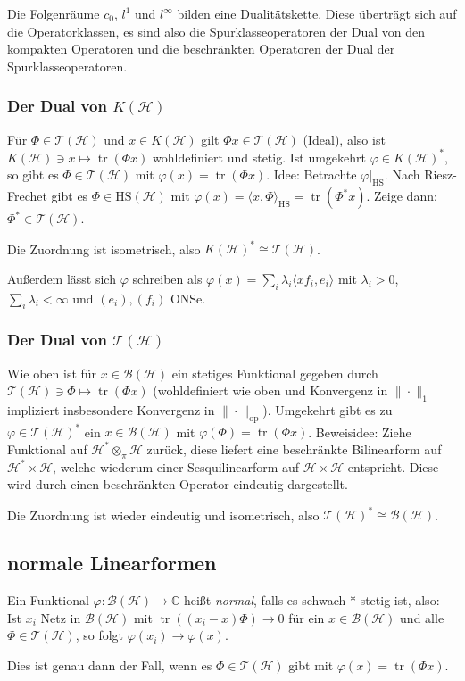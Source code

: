 \documentclass[11pt,a4paper]{scrartcl}
\newcommand{\C}{\mathbb{C}} %
\newcommand{\Hc}{\mathcal{H}}
\newcommand{\B}{\mathcal{B}}
\newcommand{\T}{\mathcal{T}}
\theoremstyle{plain}
\theoremstyle{definition}
\theoremstyle{remark}
\DeclareMathOperator{\tr}{tr}
\begin{document}
Die Folgenräume $c_0$, $l^1$ und $l^\infty$ bilden eine Dualitätskette. Diese überträgt sich auf die Operatorklassen, es sind also die Spurklasseoperatoren der Dual von den kompakten Operatoren und die beschränkten Operatoren der Dual der Spurklasseoperatoren.

\subsubsection{Der Dual von $K(\Hc)$}

Für $\Phi\in \T(\Hc)$ und $x\in K(\Hc)$ gilt $\Phi x\in \T(\Hc)$ (Ideal), also ist $K(\Hc) \ni x\mapsto \tr(\Phi x)$ wohldefiniert und stetig. Ist umgekehrt $\varphi\in K(\Hc)^*$, so gibt es $\Phi\in \T(\Hc)$ mit $\varphi(x)=\tr(\Phi x)$. Idee: Betrachte $\varphi|_\mathrm{HS}$. Nach Riesz-Frechet gibt es $\Phi\in \mathrm{HS}(\Hc)$ mit $\varphi(x)=\langle x, \Phi \rangle_\mathrm{HS} = \tr(\Phi^* x)$. Zeige dann: $\Phi^* \in \T(\Hc)$.

Die Zuordnung ist isometrisch, also $K(\Hc)^*\cong \T(\Hc)$.

Außerdem lässt sich $\varphi$ schreiben als $\varphi(x)=\sum_i \lambda_i \langle x f_i, e_i \rangle$ mit $\lambda_i > 0$, $\sum_i \lambda_i < \infty$ und $(e_i),(f_i)$ ONSe.

\subsubsection{Der Dual von $\T(\Hc)$}

Wie oben ist für $x\in \B(\Hc)$ ein stetiges Funktional gegeben durch $\T(\Hc) \ni \Phi \mapsto \tr(\Phi x)$ (wohldefiniert wie oben und Konvergenz in $\|\cdot\|_1$ impliziert insbesondere Konvergenz in $\|\cdot\|_\mathrm{op}$). Umgekehrt gibt es zu $\varphi\in \T(\Hc)^*$ ein $x\in \B(\Hc)$ mit $\varphi(\Phi)=\tr(\Phi x)$. Beweisidee: Ziehe Funktional auf $\Hc^*\otimes_\pi \Hc$ zurück, diese liefert eine beschränkte Bilinearform auf $\Hc^* \times \Hc$, welche wiederum einer Sesquilinearform auf $\Hc\times \Hc$ entspricht. Diese wird durch einen beschränkten Operator eindeutig dargestellt.

Die Zuordnung ist wieder eindeutig und isometrisch, also $\T(\Hc)^*\cong \B(\Hc)$.

\subsection{normale Linearformen}

Ein Funktional $\varphi: \B(\Hc)\to \C$ heißt \emph{normal}, falls es schwach-*-stetig ist, also: Ist $x_i$ Netz in $\B(\Hc)$ mit $\tr((x_i-x)\Phi)\to 0$ für ein $x\in \B(\Hc)$ und alle $\Phi\in \T(\Hc)$, so folgt $\varphi(x_i)\to\varphi(x)$.

Dies ist genau dann der Fall, wenn es $\Phi\in \T(\Hc)$ gibt mit $\varphi(x)=\tr(\Phi x)$.
\end{document}
